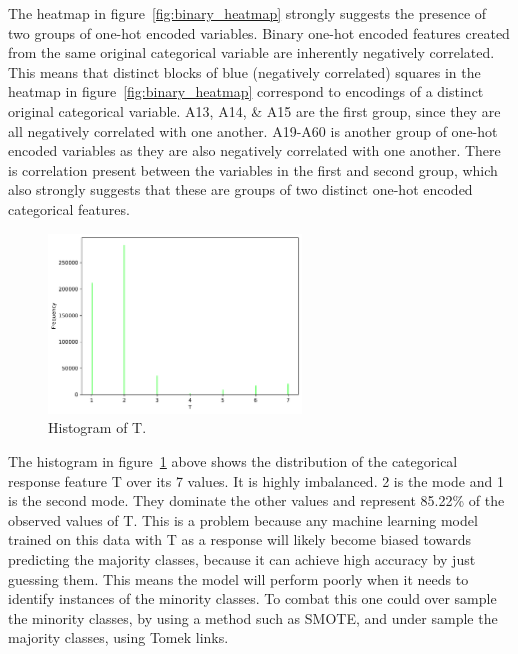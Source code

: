 \documentclass[11pt]{report}
\begin{document}
The heatmap in figure~\ref{fig:binary_heatmap} strongly suggests the presence of two groups of one-hot encoded variables. Binary one-hot encoded features created from the same original categorical variable are inherently negatively correlated. This means that distinct blocks of blue (negatively correlated) squares in the heatmap in figure~\ref{fig:binary_heatmap} correspond to encodings of a distinct original categorical variable. A13, A14, \& A15 are the first group, since they are all negatively correlated with one another. A19-A60 is another group of one-hot encoded variables as they are also negatively correlated with one another. There is correlation present between the variables in the first and second group, which also strongly suggests that these are groups of two distinct one-hot encoded categorical features.

\begin{figure}[H]
    \centering
    \includegraphics[width=0.6\textwidth]{images/T_histplot.pdf}
    \caption{Histogram of T.}
    \label{fig:t_histplot}
\end{figure}

The histogram in figure~\ref{fig:t_histplot} above shows the distribution of the categorical response feature T over its 7 values. It is highly imbalanced. 2 is the mode and 1 is the second mode. They dominate the other values and represent 85.22\% of the observed values of T. This is a problem because any machine learning model trained on this data with T as a response will likely become biased towards predicting the majority classes, because it can achieve high accuracy by just guessing them. This means the model will perform poorly when it needs to identify instances of the minority classes. To combat this one could over sample the minority classes, by using a method such as SMOTE, and under sample the majority classes, using Tomek links.
\end{document}
